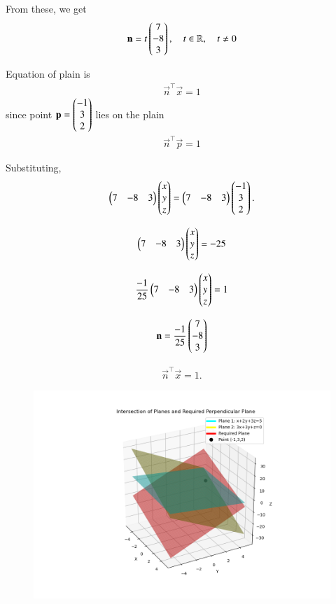 \documentclass[journal]{IEEEtran}
\begin{document}
From these, we get
\begin{align}
\mathbf{n} = t \begin{pmatrix}7 \\ -8 \\ 3\end{pmatrix}, \quad t \in \mathbb{R}, \quad t \neq 0
\end{align}

Equation of plain is 
\begin{align}
    \vec{n}^\top\vec{x}=1
\end{align}
since point $\mathbf{p}=\begin{pmatrix}-1 \\ 3 \\ 2\end{pmatrix}$ lies on the plain
\begin{align}
    \vec{n}^\top\vec{p}=1
\end{align}

Substituting,
\begin{align}
\begin{pmatrix}7 & -8 & 3\end{pmatrix}
\begin{pmatrix}x \\ y \\ z\end{pmatrix}
=
\begin{pmatrix}7 & -8 & 3\end{pmatrix}\begin{pmatrix}-1 \\ 3 \\ 2\end{pmatrix}.
\end{align}

\begin{align}
\begin{pmatrix}7 & -8 & 3\end{pmatrix}
\begin{pmatrix}x \\ y \\ z\end{pmatrix}
= -25
\end{align}

\begin{align}
\frac{-1}{25}\begin{pmatrix}7 & -8 & 3\end{pmatrix}
\begin{pmatrix}x \\ y \\ z\end{pmatrix}
=1 
\end{align}

\begin{align}
\mathbf{n}=\frac{-1}{25}\begin{pmatrix}7 \\ -8 \\ 3\end{pmatrix}
\end{align}

\begin{align}
\vec{n}^\top \vec{x} = 1.
\end{align}

\begin{figure}[H]
    \centering
    \includegraphics[width=0.8\linewidth]{figs/plot8.png}
    \caption{}
    \label{fig:placeholder}
\end{figure}
\end{document}
